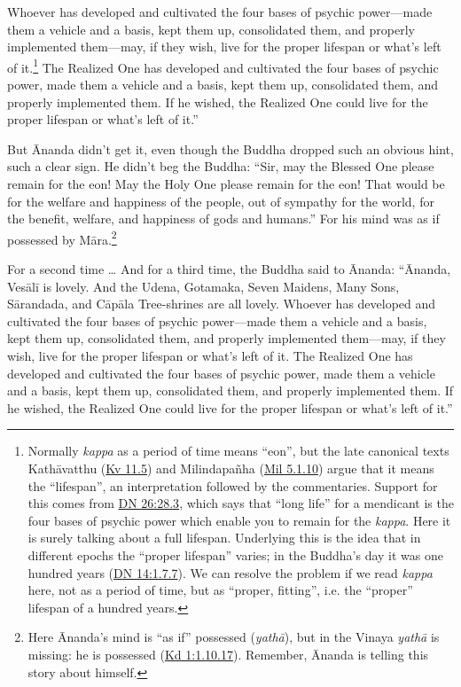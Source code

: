 \documentclass[12pt,openany]{book}%
\begin{document}
Whoever has developed and cultivated the four bases of psychic power—made them a vehicle and a basis, kept them up, consolidated them, and properly implemented them—may, if they wish, live for the proper lifespan or what’s left of it.\footnote{Normally \textit{kappa} as a period of time means “eon”, but the late canonical texts \textsanskrit{Kathāvatthu} (\href{https://suttacentral.net/kv11.5}{Kv 11.5}) and \textsanskrit{Milindapañha} (\href{https://suttacentral.net/mil5.1.10}{Mil 5.1.10}) argue that it means the “lifespan”, an interpretation followed by the commentaries. Support for this comes from \href{https://suttacentral.net/dn26/en/sujato\#28.3}{DN 26:28.3}, which says that “long life” for a mendicant is the four bases of psychic power which enable you to remain for the \textit{kappa}. Here it is surely talking about a full lifespan. Underlying this is the idea that in different epochs the “proper lifespan” varies; in the Buddha’s day it was one hundred years (\href{https://suttacentral.net/dn14/en/sujato\#1.7.7}{DN 14:1.7.7}). We can resolve the problem if we read \textit{kappa} here, not as a period of time, but as “proper, fitting”, i.e. the “proper” lifespan of a hundred years. } The Realized One has developed and cultivated the four bases of psychic power, made them a vehicle and a basis, kept them up, consolidated them, and properly implemented them. If he wished, the Realized One could live for the proper lifespan or what’s left of it.” 

But Ānanda didn’t get it, even though the Buddha dropped such an obvious hint, such a clear sign. He didn’t beg the Buddha: “Sir, may the Blessed One please remain for the eon! May the Holy One please remain for the eon! That would be for the welfare and happiness of the people, out of sympathy for the world, for the benefit, welfare, and happiness of gods and humans.” For his mind was as if possessed by \textsanskrit{Māra}.\footnote{Here Ānanda’s mind is “as if” possessed (\textit{\textsanskrit{yathā}}), but in the Vinaya \textit{\textsanskrit{yathā}} is missing: he is possessed (\href{https://suttacentral.net/pli-tv-kd1/en/sujato\#1.10.17}{Kd 1:1.10.17}). Remember, Ānanda is telling this story about himself. } 

For a second time … And for a third time, the Buddha said to Ānanda: “Ānanda, \textsanskrit{Vesālī} is lovely. And the Udena, Gotamaka, Seven Maidens, Many Sons, \textsanskrit{Sārandada}, and \textsanskrit{Cāpāla} Tree-shrines are all lovely. Whoever has developed and cultivated the four bases of psychic power—made them a vehicle and a basis, kept them up, consolidated them, and properly implemented them—may, if they wish, live for the proper lifespan or what’s left of it. The Realized One has developed and cultivated the four bases of psychic power, made them a vehicle and a basis, kept them up, consolidated them, and properly implemented them. If he wished, the Realized One could live for the proper lifespan or what’s left of it.” 
\end{document}
